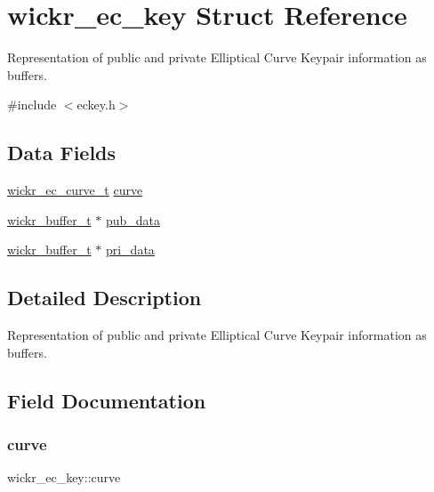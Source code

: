\hypertarget{structwickr__ec__key}{}\section{wickr\+\_\+ec\+\_\+key Struct Reference}
\label{structwickr__ec__key}


Representation of public and private Elliptical Curve Keypair information as buffers.  




{\ttfamily \#include $<$eckey.\+h$>$}

\subsection*{Data Fields}
\begin{DoxyCompactItemize}
\item 
\hyperlink{structwickr__ec__curve}{wickr\+\_\+ec\+\_\+curve\+\_\+t} \hyperlink{structwickr__ec__key_a0fbe90131941d685f618ef6816e8c471}{curve}
\item 
\hyperlink{structwickr__buffer}{wickr\+\_\+buffer\+\_\+t} $\ast$ \hyperlink{structwickr__ec__key_af972d3c8b571df0ef009ebf079705e82}{pub\+\_\+data}
\item 
\hyperlink{structwickr__buffer}{wickr\+\_\+buffer\+\_\+t} $\ast$ \hyperlink{structwickr__ec__key_a67c23110b722401c6ba8b883b3aa74fc}{pri\+\_\+data}
\end{DoxyCompactItemize}


\subsection{Detailed Description}
Representation of public and private Elliptical Curve Keypair information as buffers. 

\subsection{Field Documentation}
\mbox{\label{structwickr__ec__key_a0fbe90131941d685f618ef6816e8c471}} 
\subsubsection{\texorpdfstring{curve}{curve}}
{\footnotesize\ttfamily wickr\+\_\+ec\+\_\+key\+::curve}

